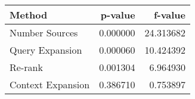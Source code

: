 \begin{tabular}{lrr}
\toprule
Method & p-value & f-value \\
\midrule
Number Sources & 0.000000 & 24.313682 \\
Query Expansion & 0.000060 & 10.424392 \\
Re-rank & 0.001304 & 6.964930 \\
Context Expansion & 0.386710 & 0.753897 \\
\bottomrule
\end{tabular}
